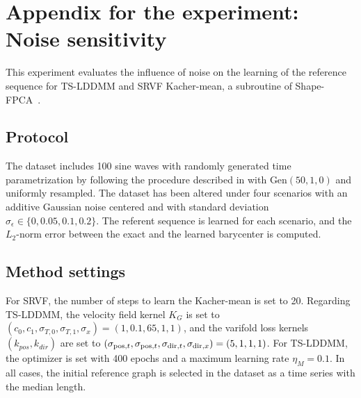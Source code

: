 \section{Appendix for the experiment: Noise sensitivity}
This experiment evaluates the influence of noise on the learning of the reference sequence for TS-LDDMM and SRVF Kacher-mean, a subroutine of Shape-FPCA~\cite{wu2024shape}. 

\subsection{Protocol}
The dataset includes 100 sine waves with randomly generated time parametrization by following the procedure described in  with $\text{Gen}(50,1,0)$ and uniformly resampled. The dataset has been altered under four scenarios with an additive Gaussian noise centered and with standard deviation $\sigma_\epsilon \in \{0,0.05,0.1,0.2\}$. The referent sequence is learned for each scenario, and the $L_2$-norm error between the exact and the learned barycenter is computed. 

\subsection{Method settings}
For SRVF, the number of steps to learn the Kacher-mean is set to 20. Regarding TS-LDDMM, the velocity field kernel $K_G$ is set to $ (c_0,c_1,\sigma_{T,0},\sigma_{T,1},\sigma_x) = (1,0.1,65,1,1)$, and the varifold loss kernels $(k_{pos},k_{dir})$ are set to $(\sigma_{\mathrm{pos},t}, \sigma_{\mathrm{pos},t}, \sigma_{\mathrm{dir},t}, \sigma_{\mathrm{dir},x}) = (5,1,1,1)$. For TS-LDDMM, the optimizer is set with 400 epochs and a maximum learning rate $\eta_M = 0.1$. In all cases, the initial reference graph is selected in the dataset as a time series with the median length.


